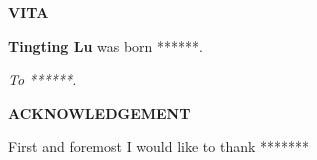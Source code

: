 \newpage
\begin{center}
 {\large\bf VITA}\vspace{0.3in} \\
 
 
\end{center}

\doublespacing

\vspace{-1mm}
\textbf{Tingting Lu} was born ******. 

\newpage
 
 
 \vspace*{2in}

 
{\large \sl
\hspace{1in} To ******.   
}


\newpage
\begin{center}
{\large\bf ACKNOWLEDGEMENT}\vspace{0.3in}
\end{center}
First and foremost I would like to thank *******